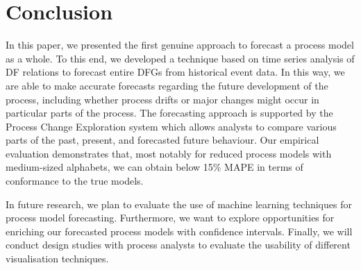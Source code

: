 \section{Conclusion}\label{sec:conclusion}
In this paper, we presented the first genuine approach to forecast a process model as a whole. To this end, we developed a technique based on time series analysis of DF relations to forecast entire DFGs from historical event data. 
In this way, we are able to make accurate forecasts regarding the future development of the process, including whether process drifts or major changes might occur in particular parts of the process. 
The forecasting approach is supported by the Process Change Exploration system which allows analysts to compare various parts of the past, present, and forecasted future behaviour.
Our empirical evaluation demonstrates that, most notably for reduced process models with medium-sized alphabets, we can obtain below 15\% MAPE in terms of conformance to the true models.

In future research, we plan to evaluate the use of machine learning techniques for process model forecasting. Furthermore, we want to explore opportunities for enriching our forecasted process models with confidence intervals. Finally, we will conduct design studies with process analysts to evaluate the usability of different visualisation techniques.